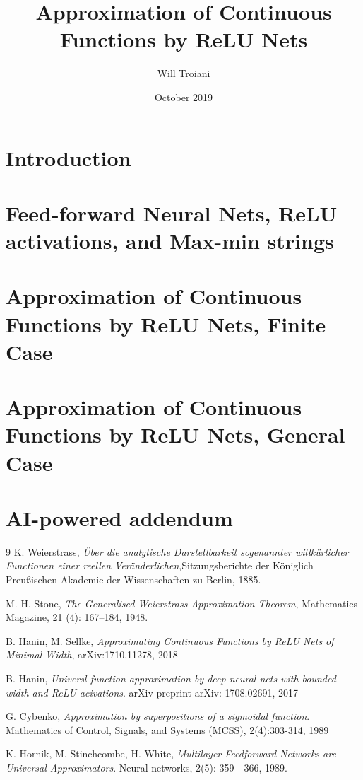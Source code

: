 \documentclass[12pt]{article}
\title{Approximation of Continuous Functions by ReLU Nets}
\author{Will Troiani}
\date{October 2019}
\begin{document}
\maketitle

\section{Introduction}


\section{Feed-forward Neural Nets, ReLU activations, and Max-min strings}


\section{Approximation of Continuous Functions by ReLU Nets, Finite Case}


\section{Approximation of Continuous Functions by ReLU Nets, General Case}
\label{main}


\section{AI-powered addendum}
\label{sec:ai-powered-addendum}


\newpage
\begin{thebibliography}{9}
 K. Weierstrass, \emph{Über die analytische Darstellbarkeit sogenannter willkürlicher Functionen einer reellen Veränderlichen},Sitzungsberichte der Königlich Preußischen Akademie der Wissenschaften zu Berlin, 1885.

 M. H. Stone, \emph{The Generalised Weierstrass Approximation Theorem}, Mathematics Magazine, 21 (4): 167–184, 1948.

 B. Hanin, M. Sellke, \emph{Approximating Continuous Functions by ReLU Nets of Minimal Width}, arXiv:1710.11278, 2018

 B. Hanin, \emph{Universl function approximation by deep neural nets with bounded width and ReLU acivations}. arXiv preprint arXiv: 1708.02691, 2017

 G. Cybenko, \emph{Approximation by superpositions of a sigmoidal function}. Mathematics of Control, Signals, and Systems (MCSS), 2(4):303-314, 1989

 K. Hornik, M. Stinchcombe, H. White, \emph{Multilayer Feedforward Networks are Universal Approximators}. Neural networks, 2(5): 359 - 366, 1989.

\end{thebibliography}
\end{document}
